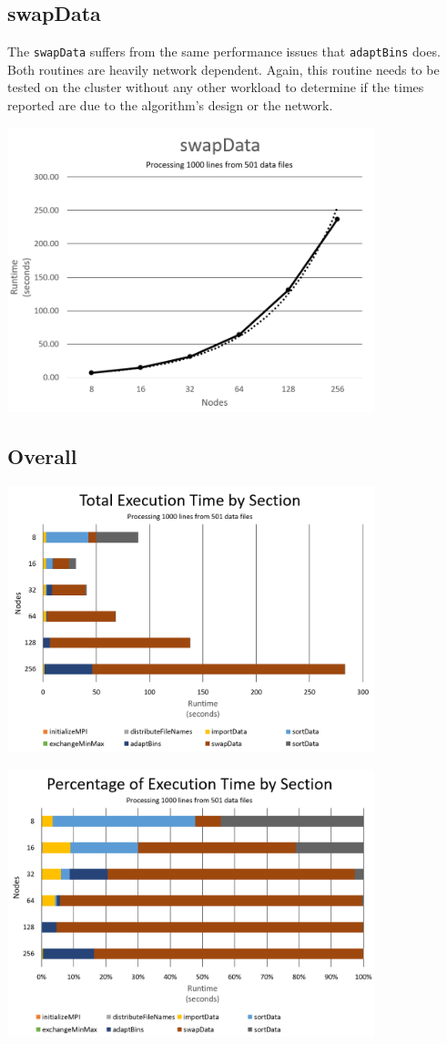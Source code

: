 \subsection{swapData}

The \texttt{swapData} suffers from the same performance issues that \texttt{adaptBins} does. Both routines are heavily network dependent. Again, this routine needs to be tested on the cluster without any other workload to determine if the times reported are due to the algorithm's design or the network.

\includegraphics[width=0.8\textwidth]{swapData.png}


\subsection{Overall}

\includegraphics[width=0.8\textwidth]{totalTime.png}

\includegraphics[width=0.8\textwidth]{percentTime.png}


